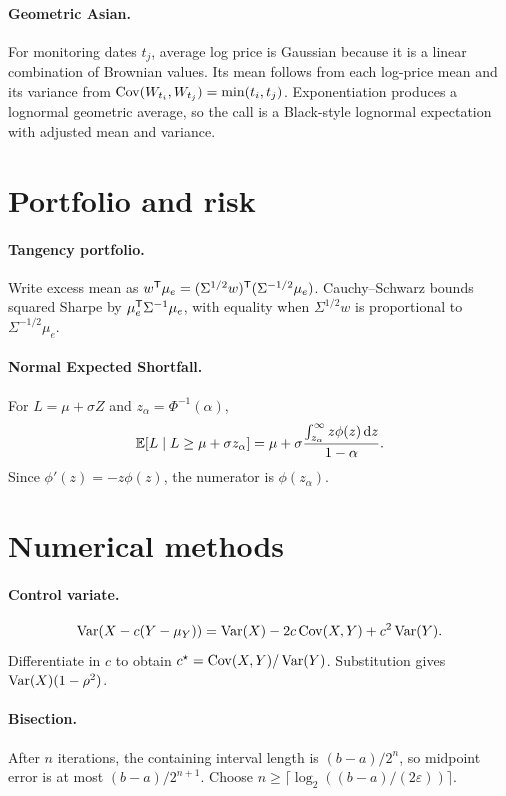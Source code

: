 \paragraph{Geometric Asian.}
For monitoring dates $t_j$, average log price is Gaussian because it is a linear
combination of Brownian values. Its mean follows from each log-price mean and its
variance from
$\operatorname{Cov}(W_{t_i},W_{t_j})=\min(t_i,t_j)$. Exponentiation produces a lognormal
geometric average, so the call is a Black-style lognormal expectation with adjusted
mean and variance.

\section{Portfolio and risk}

\paragraph{Tangency portfolio.}
Write excess mean as
$w^\mathsf T\mu_e=(\Sigma^{1/2}w)^\mathsf T(\Sigma^{-1/2}\mu_e)$.
Cauchy--Schwarz bounds squared Sharpe by
$\mu_e^\mathsf T\Sigma^{-1}\mu_e$, with equality when
$\Sigma^{1/2}w$ is proportional to $\Sigma^{-1/2}\mu_e$.

\paragraph{Normal Expected Shortfall.}
For $L=\mu+\sigma Z$ and $z_\alpha=\Phi^{-1}(\alpha)$,
\[
\operatorname{\mathbb E}[L\mid L\geq\mu+\sigma z_\alpha]
=\mu+\sigma
\frac{\int_{z_\alpha}^\infty z\phi(z)\,\mathrm d z}
{1-\alpha}.
\]
Since $\phi'(z)=-z\phi(z)$, the numerator is $\phi(z_\alpha)$.

\section{Numerical methods}

\paragraph{Control variate.}
\[
\operatorname{Var}(X-c(Y-\mu_Y))
=\operatorname{Var}(X)-2c\operatorname{Cov}(X,Y)+c^2\operatorname{Var}(Y).
\]
Differentiate in $c$ to obtain $c^\star=\operatorname{Cov}(X,Y)/\operatorname{Var}(Y)$. Substitution gives
$\operatorname{Var}(X)(1-\rho^2)$.

\paragraph{Bisection.}
After $n$ iterations, the containing interval length is $(b-a)/2^n$, so midpoint
error is at most $(b-a)/2^{n+1}$. Choose
$n\geq\lceil\log_2((b-a)/(2\varepsilon))\rceil$.

